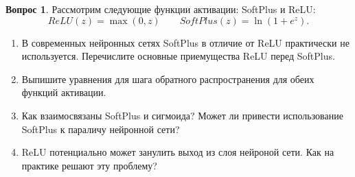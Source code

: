 \documentclass[12pt]{article}
\theoremstyle{definition}
\newtheorem{question}{Вопрос}
\begin{document}
\begin{question} Рассмотрим следующие функции активации: SoftPlus и ReLU: 
    \[
    ReLU(z) = \max(0, z) \qquad SoftPlus(z) = \ln(1 + e^z).
    \]
    
    \begin{enumerate}
        \item В современных нейронных сетях SoftPlus в отличие от ReLU практически не используется. Перечислите основные приемущества ReLU перед SoftPlus. 
        \item Выпишите уравнения для шага обратного распространения для обеих функций активации. 
        \item Как взаимосвязаны SoftPlus и сигмоида? Может ли привести использование SoftPlus к параличу нейронной сети? 
        \item ReLU потенциально может занулить выход из слоя нейроной сети. Как на практике решают эту проблему? 
    \end{enumerate} 
\end{question}


\newpage 
\end{document}
